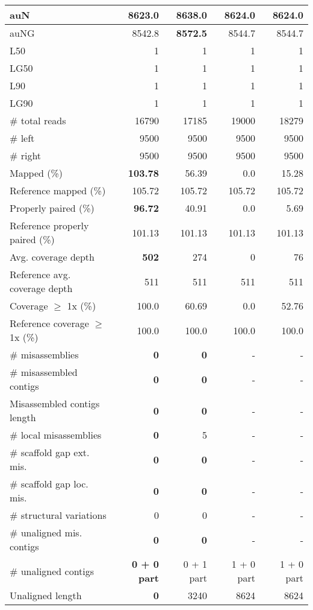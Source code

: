 \documentclass[12pt,a4paper]{article}
\begin{document}
\begin{table}[ht]
\begin{center}
\begin{tabular}{|l*{4}{|r}|}
auN & 8623.0 & {\bf 8638.0} & 8624.0 & 8624.0 \\ \hline
auNG & 8542.8 & {\bf 8572.5} & 8544.7 & 8544.7 \\ \hline
L50 & 1 & 1 & 1 & 1 \\ \hline
LG50 & 1 & 1 & 1 & 1 \\ \hline
L90 & 1 & 1 & 1 & 1 \\ \hline
LG90 & 1 & 1 & 1 & 1 \\ \hline
\# total reads & 16790 & 17185 & 19000 & 18279 \\ \hline
\# left & 9500 & 9500 & 9500 & 9500 \\ \hline
\# right & 9500 & 9500 & 9500 & 9500 \\ \hline
Mapped (\%) & {\bf 103.78} & 56.39 & 0.0 & 15.28 \\ \hline
Reference mapped (\%) & 105.72 & 105.72 & 105.72 & 105.72 \\ \hline
Properly paired (\%) & {\bf 96.72} & 40.91 & 0.0 & 5.69 \\ \hline
Reference properly paired (\%) & 101.13 & 101.13 & 101.13 & 101.13 \\ \hline
Avg. coverage depth & {\bf 502} & 274 & 0 & 76 \\ \hline
Reference avg. coverage depth & 511 & 511 & 511 & 511 \\ \hline
Coverage $\geq$ 1x (\%) & 100.0 & 60.69 & 0.0 & 52.76 \\ \hline
Reference coverage $\geq$ 1x (\%) & 100.0 & 100.0 & 100.0 & 100.0 \\ \hline
\# misassemblies & {\bf 0} & {\bf 0} & - & - \\ \hline
\# misassembled contigs & {\bf 0} & {\bf 0} & - & - \\ \hline
Misassembled contigs length & {\bf 0} & {\bf 0} & - & - \\ \hline
\# local misassemblies & {\bf 0} & 5 & - & - \\ \hline
\# scaffold gap ext. mis. & {\bf 0} & {\bf 0} & - & - \\ \hline
\# scaffold gap loc. mis. & {\bf 0} & {\bf 0} & - & - \\ \hline
\# structural variations & 0 & 0 & - & - \\ \hline
\# unaligned mis. contigs & {\bf 0} & {\bf 0} & - & - \\ \hline
\# unaligned contigs & {\bf 0 + 0 part} & 0 + 1 part & 1 + 0 part & 1 + 0 part \\ \hline
Unaligned length & {\bf 0} & 3240 & 8624 & 8624 \\ \hline

\end{tabular}
\end{center}
\end{table}
\end{document}
